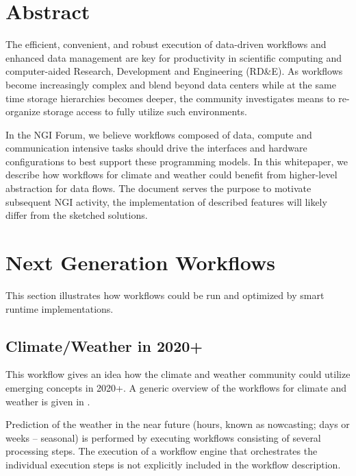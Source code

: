 \documentclass[a4paper, twocolumn]{article}
\title{\papertitle}
\author{Julian M. Kunkel
  \textit{University of Reading}
	\and
  Chris Hoffman
  \textit{National Center for Atmospheric Research}
}
\date{Version: \pversion; \today}
\begin{document}
\maketitle
\thispagestyle{fancy}

\section*{Abstract}
The efficient, convenient, and robust execution of data-driven workflows and enhanced data management are key for productivity in scientific computing and computer-aided Research, Development and Engineering (RD\&E).
As workflows become increasingly complex and blend beyond data centers while at the same time storage hierarchies becomes deeper, the community investigates means to re-organize storage access to fully utilize such environments.

In the NGI Forum, we believe workflows composed of data, compute and communication intensive tasks should drive the interfaces and hardware configurations to best support these programming models.
In this whitepaper, we describe how workflows for climate and weather could benefit from higher-level abstraction for data flows.
The document serves the purpose to motivate subsequent NGI activity, the implementation of described features will likely differ from the sketched solutions.

\section{Next Generation Workflows}
\label{sec:ngWorkflows}

This section illustrates how workflows could be run and optimized by smart runtime implementations.


\subsection{Climate/Weather in 2020+}

This workflow gives an idea how the climate and weather community could utilize emerging concepts in 2020+.
A generic overview of the workflows for climate and weather is given in .

Prediction of the weather in the near future (hours, known as nowcasting; days or weeks -- seasonal) is performed by executing workflows consisting of several processing steps. The execution of a workflow engine that orchestrates the individual execution steps is not explicitly included in the workflow description.
\end{document}
